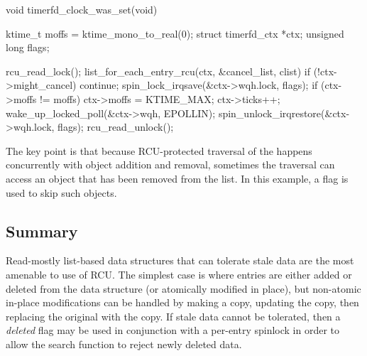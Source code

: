 \begin{VerbatimU}
	void timerfd_clock_was_set(void)
	{
		ktime_t moffs = ktime_mono_to_real(0);
		struct timerfd_ctx *ctx;
		unsigned long flags;

		rcu_read_lock();
		list_for_each_entry_rcu(ctx, &cancel_list, clist) {
			if (!ctx->might_cancel)
				continue;
			spin_lock_irqsave(&ctx->wqh.lock, flags);
			if (ctx->moffs != moffs) {
				ctx->moffs = KTIME_MAX;
				ctx->ticks++;
				wake_up_locked_poll(&ctx->wqh, EPOLLIN);
			}
			spin_unlock_irqrestore(&ctx->wqh.lock, flags);
		}
		rcu_read_unlock();
	}
\end{VerbatimU}

The key point is that because RCU-protected traversal of the
 happens concurrently with object addition and removal,
sometimes the traversal can access an object that has been removed from
the list.
In this example, a flag is used to skip such objects.


\subsection{Summary}

Read-mostly list-based data structures that can tolerate stale data are
the most amenable to use of RCU\@.
The simplest case is where entries are
either added or deleted from the data structure (or atomically modified
in place), but non-atomic in-place modifications can be handled by making
a copy, updating the copy, then replacing the original with the copy.
If stale data cannot be tolerated, then a \emph{deleted} flag may be used
in conjunction with a per-entry spinlock in order to allow the search
function to reject newly deleted data.
